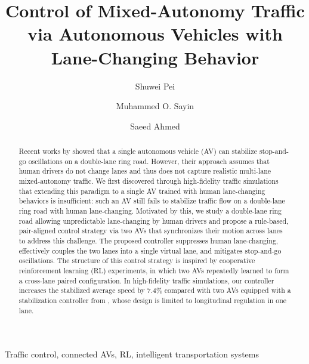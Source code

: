 \documentclass{ifacconf}
\newcommand{\1}{\mbox{1}\hspace{-0.25em}\mbox{l}}
\begin{document}
\begin{frontmatter}

\title{Control of Mixed-Autonomy Traffic via Autonomous Vehicles with Lane-Changing Behavior}


\author[NL]{Shuwei Pei} 
\author[TK]{Muhammed O. Sayin}
\author[NL]{Saeed Ahmed} 




\address[NL]{Jan C. Willems Center for Systems and Control, ENTEG, Faculty of Science and Engineering, University of Groningen, 9747 AG Groningen, the Netherlands (e-mails: s.pei@rug.nl, s.ahmed@rug.nl)}
\address[TK]{Department of Electrical, Electronics Engineering, Bilkent University, TR-06800 Ankara, Turkey (e-mail: sayin@ee.bilkent.edu.tr)}

\begin{abstract}                %
Recent works by \citet{9765650} showed that a single autonomous vehicle (AV) can stabilize stop-and-go oscillations on a double-lane ring road. However, their approach assumes that human drivers do not change lanes and thus does not capture realistic multi-lane mixed-autonomy traffic. We first discovered through high-fidelity traffic simulations that extending this paradigm to a single AV trained with human lane-changing behaviors is insufficient: such an AV still fails to stabilize traffic flow on a double-lane ring road with human lane-changing. Motivated by this, we study a double-lane ring road allowing unpredictable lane-changing by human drivers and propose a rule-based, pair-aligned control strategy via two AVs that synchronizes their motion across lanes to address this challenge. The proposed controller suppresses human lane-changing, effectively couples the two lanes into a single virtual lane, and mitigates stop-and-go oscillations. The structure of this control strategy is inspired by cooperative reinforcement learning (RL) experiments, in which two AVs repeatedly learned to form a cross-lane paired configuration. In high-fidelity traffic simulations, our controller increases the stabilized average speed by 7.4\% compared with two AVs equipped with a stabilization controller from \citet{9765650}, whose design is limited to longitudinal regulation in one lane.


\end{abstract}

\begin{keyword}
Traffic control, connected AVs, RL, intelligent transportation systems
\end{keyword}

\end{frontmatter}
\end{document}
